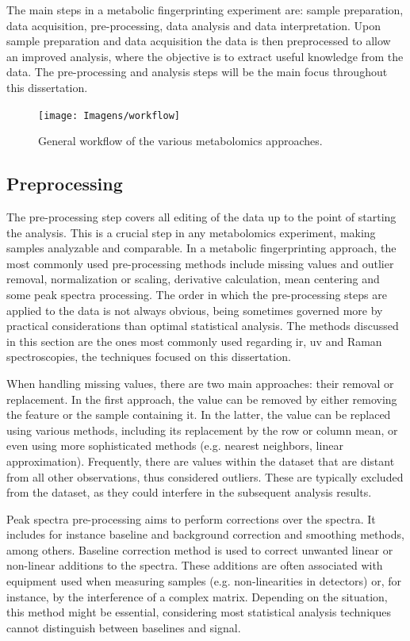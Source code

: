 The main steps in a metabolic fingerprinting experiment are: sample preparation, data acquisition, pre-processing, data analysis and data interpretation. Upon sample preparation and data acquisition the data is then preprocessed to allow an improved analysis, where the objective is to extract useful knowledge from the data. The pre-processing and analysis steps will be the main focus throughout this dissertation.

\begin{figure}[!ht]
	\centering
	\texttt{[image: Imagens/workflow]}
	\caption{General workflow of the various metabolomics approaches.}
	\label{workflow}
\end{figure}


\subsection{Preprocessing}

The pre-processing step covers all editing of the data up to the point of starting the analysis. This is a crucial step in any metabolomics experiment, making samples analyzable and comparable. In a metabolic fingerprinting approach, the most commonly used pre-processing methods include missing values and outlier removal, normalization or scaling, derivative calculation, mean centering and some peak spectra processing. The order in which the pre-processing steps are applied to the data is not always obvious, being sometimes governed more by practical considerations than optimal statistical analysis. The methods discussed in this section are the ones most commonly used regarding \gls{ir}, \gls{uv} and Raman spectroscopies, the techniques focused on this dissertation.

When handling missing values, there are two main approaches: their removal or replacement. In the first approach, the value can be removed by either removing the feature or the sample containing it. In the latter, the value can be replaced using various methods, including its replacement by the row or column mean, or even using more sophisticated methods (e.g. nearest neighbors, linear approximation). Frequently, there are values within the dataset that are distant from all other observations, thus considered outliers. These are typically excluded from the dataset, as they could interfere in the subsequent analysis results.

Peak spectra pre-processing aims to perform corrections over the spectra. It includes for instance baseline and background correction and smoothing methods, among others. Baseline correction method is used to correct unwanted linear or non-linear additions to the spectra. These additions are often associated with equipment used when measuring samples (e.g. non-linearities in detectors) or, for instance, by the interference of a complex matrix. Depending on the situation, this method might be essential, considering most statistical analysis techniques cannot distinguish between baselines and signal. 


